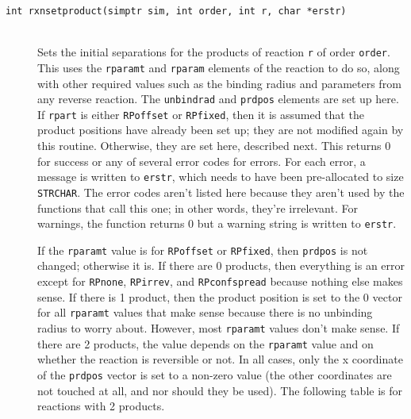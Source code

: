 \documentclass {scrbook}
\newcommand {\ttt} {\texttt}
\begin{document}
\begin{description}
\item[\ttt{int rxnsetproduct(simptr sim, int order, int r, char *erstr)}]
\hfill \\
Sets the initial separations for the products of reaction \ttt{r} of order \ttt{order}. This uses the \ttt{rparamt} and \ttt{rparam} elements of the reaction to do so, along with other required values such as the binding radius and parameters from any reverse reaction. The \ttt{unbindrad} and \ttt{prdpos} elements are set up here. If \ttt{rpart} is either \ttt{RPoffset} or \ttt{RPfixed}, then it is assumed that the product positions have already been set up; they are not modified again by this routine. Otherwise, they are set here, described next. This returns 0 for success or any of several error codes for errors. For each error, a message is written to \ttt{erstr}, which needs to have been pre-allocated to size \ttt{STRCHAR}. The error codes aren't listed here because they aren't used by the functions that call this one; in other words, they're irrelevant. For warnings, the function returns 0 but a warning string is written to \ttt{erstr}.

If the \ttt{rparamt} value is for \ttt{RPoffset} or \ttt{RPfixed}, then \ttt{prdpos} is not changed; otherwise it is. If there are 0 products, then everything is an error except for \ttt{RPnone}, \ttt{RPirrev}, and \ttt{RPconfspread} because nothing else makes sense. If there is 1 product, then the product position is set to the 0 vector for all \ttt{rparamt} values that make sense because there is no unbinding radius to worry about. However, most \ttt{rparamt} values don't make sense. If there are 2 products, the value depends on the \ttt{rparamt} value and on whether the reaction is reversible or not. In all cases, only the x coordinate of the \ttt{prdpos} vector is set to a non-zero value (the other coordinates are not touched at all, and nor should they be used). The following table is for reactions with 2 products.


\end{description}
\end{document}
